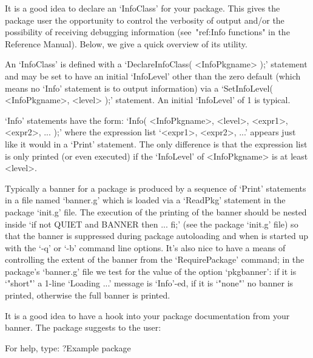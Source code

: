 
It is a good idea to declare an `InfoClass' for your package. This  gives
the package user the opportunity  to  control  the  verbosity  of  output
and/or the possibility of receiving debugging information  (see~"ref:Info
functions" in the {\GAP}  Reference  Manual).  Below,  we  give  a  quick
overview of its utility.

An `InfoClass' is defined with  a  `DeclareInfoClass(  <InfoPkgname>  );'
statement and may be set to have an initial `InfoLevel'  other  than  the
zero default (which means no `Info' statement is to  output  information)
via a `SetInfoLevel( <InfoPkgname>, <level>  );'  statement.  An  initial
`InfoLevel' of 1 is typical.

`Info' statements have the form: `Info( <InfoPkgname>, <level>,  <expr1>,
<expr2>, ... );'  where  the  expression  list  `<expr1>,  <expr2>,  ...'
appears just like it would in a `Print' statement. The only difference is
that the expression list is  only  printed  (or  even  executed)  if  the
`InfoLevel' of <InfoPkgname> is at least <level>.


Typically a banner for a package is produced by  a  sequence  of  `Print'
statements in a file named `banner.g' which is  loaded  via  a  `ReadPkg'
statement in the package `init.g' file. The execution of the printing  of
the banner should be nested inside `if not QUIET and BANNER then ... fi;'
(see the  {\Example}  package  `init.g'  file)  so  that  the  banner  is
suppressed during package autoloading and when {\GAP} is started up  with
the `-q' or `-b' command line options. It's also nice to have a means  of
controlling the extent of the banner from the  `RequirePackage'  command;
in the {\Example} package's `banner.g' file we test for the value of  the
option `pkgbanner': if it is `"short"' a 1-line `Loading ...' message  is
`Info'-ed, if it is `"none"' no banner is  printed,  otherwise  the  full
banner is printed.

It is a good idea to have a hook into  your  package  documentation  from
your banner. The {\Example} package suggests to the {\GAP} user:

\begintt
For help, type: ?Example package
\endtt


